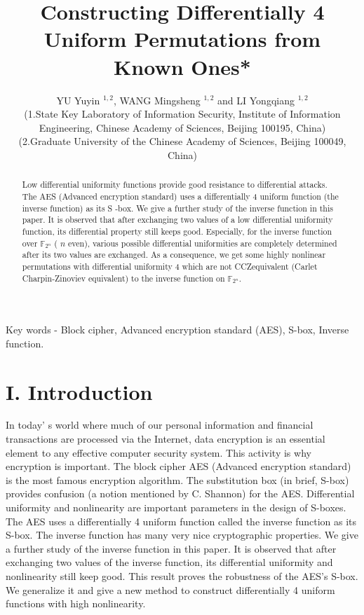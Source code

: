 \documentclass[10pt]{article}
\title{Constructing Differentially 4 Uniform Permutations from Known Ones* }
\author{YU Yuyin ${ }^{1,2}$, WANG Mingsheng ${ }^{1,2}$ and LI Yongqiang ${ }^{1,2}$\\
(1.State Key Laboratory of Information Security, Institute of Information Engineering, Chinese Academy of Sciences, Beijing 100195, China)\\
(2.Graduate University of the Chinese Academy of Sciences, Beijing 100049, China)}
\date{}
\begin{document}
\maketitle
\captionsetup{singlelinecheck=false}


\begin{abstract}
Low differential uniformity functions provide good resistance to differential attacks. The AES (Advanced encryption standard) uses a differentially 4 uniform function (the inverse function) as its S -box. We give a further study of the inverse function in this paper. It is observed that after exchanging two values of a low differential uniformity function, its differential property still keeps good. Especially, for the inverse function over $\mathbb{F}_{2^{n}}$ ( $n$ even), various possible differential uniformities are completely determined after its two values are exchanged. As a consequence, we get some highly nonlinear permutations with differential uniformity 4 which are not CCZequivalent (Carlet Charpin-Zinoviev equivalent) to the inverse function on $\mathbb{F}_{2^{n}}$.
\end{abstract}

Key words - Block cipher, Advanced encryption standard (AES), S-box, Inverse function.

\section*{I. Introduction}
In today' s world where much of our personal information and financial transactions are processed via the Internet, data encryption is an essential element to any effective computer security system. This activity is why encryption is important. The block cipher AES (Advanced encryption standard) is the most famous encryption algorithm. The substitution box (in brief, S-box) provides confusion (a notion mentioned by C. Shannon) for the AES. Differential uniformity and nonlinearity are important parameters in the design of S-boxes. The AES uses a differentially 4 uniform function called the inverse function as its S-box. The inverse function has many very nice cryptographic properties. We give a further study of the inverse function in this paper. It is observed that after exchanging two values of the inverse function, its differential uniformity and nonlinearity still keep good. This result proves the robustness of the AES's S-box. We generalize it and give a new method to construct differentially 4 uniform functions with high nonlinearity.
\end{document}
